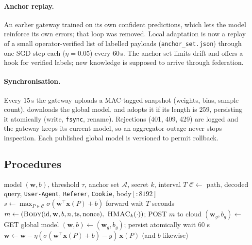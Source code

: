 \paragraph{Anchor replay.}
An earlier gateway trained on its own confident predictions, which lets the model reinforce its own errors; that loop was removed. Local adaptation is now a replay of a small operator-verified list of labelled payloads (\texttt{anchor\_set.json}) through one SGD step each ($\eta=0.05$) every $60$\,s. The anchor set limits drift and offers a hook for verified labels; new knowledge is supposed to arrive through federation.

\paragraph{Synchronisation.}
Every $15$\,s the gateway uploads a MAC-tagged snapshot (weights, bias, sample count), downloads the global model, and adopts it if its length is $259$, persisting it atomically (write, \texttt{fsync}, rename). Rejections (401, 409, 429) are logged and the gateway keeps its current model, so an aggregator outage never stops inspection. Each published global model is versioned to permit rollback.

\subsection{Procedures}
\label{sec:sys-alg}
\begin{algorithm}[t]
\caption{Edge gateway: inspection and synchronisation}
\label{alg:gateway}
\begin{algorithmic}[1]
\Require model $(\mathbf{w},b)$, threshold $\tau$, anchor set $\mathcal{A}$, secret $k$, interval $T$
  \State $\mathcal{C}\gets$ path, decoded query, \texttt{User-Agent}, \texttt{Referer}, \texttt{Cookie}, body$[{:}8192]$
  \State $s\gets \max_{P\in\mathcal{C}} \sigma(\mathbf{w}^\top\mathbf{x}(P)+b)$
    \Else{} \Return forward \EndIf
\EndProcedure
{}
   wait $T$ seconds
    \State $m\gets (\textsc{Body}(\text{id},\mathbf{w},b,n,\text{ts},\text{nonce}),\ \textsc{HMAC}_k(\cdot))$; POST $m$ to cloud
    \State $(\mathbf{w}_g,b_g)\gets$ GET global model
     $(\mathbf{w},b)\gets(\mathbf{w}_g,b_g)$; persist atomically \EndIf
  \EndWhile
\EndProcedure
{}
   wait $60$ s
     $\mathbf{w}\gets\mathbf{w}-\eta(\sigma(\mathbf{w}^\top\mathbf{x}(P)+b)-y)\,\mathbf{x}(P)$ (and $b$ likewise) \EndFor
  \EndWhile
\EndProcedure
\end{algorithmic}
\end{algorithm}

